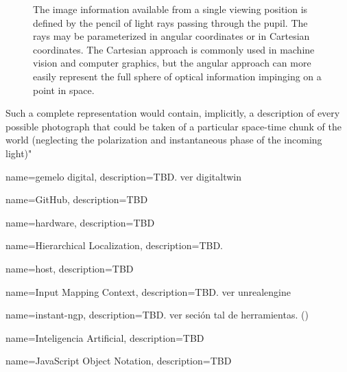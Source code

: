 {{\begin{figure}[H]
        \caption{The image information available from a single viewing position is defined by the pencil of light rays passing through the pupil. The rays may be parameterized in angular coordinates or in Cartesian coordinates. The Cartesian approach is commonly used in machine vision and computer graphics, but the angular approach can more easily represent the full sphere of optical information impinging on a point in space.}
        \label{fig:funcion-plenoptica}
    \end{figure}
    Such a complete representation would contain, implicitly, a description of every possible photograph that could be taken of a particular space-time chunk of the world (neglecting the polarization and instantaneous phase of the incoming light)"}
}


{
    name={gemelo digital},
    description={TBD. ver \gls{digitaltwin}}
}

{
    name={GitHub},
    description={TBD}
}


{
    name={hardware},
    description={TBD}
}

{
    name={Hierarchical Localization},
    description={TBD. \cite{sarlin2019coarse}}
}

{
    name={host},
    description={TBD}
}


{
    name={Input Mapping Context},
    description={TBD. ver \gls{unrealengine}}
}

{
    name={instant-ngp},
    description={TBD. ver seción tal de herramientas. (\cite{mueller2022instant})}
}

{
    name={Inteligencia Artificial},
    description={TBD}
}


{
    name={JavaScript Object Notation},
    description={TBD}
}



